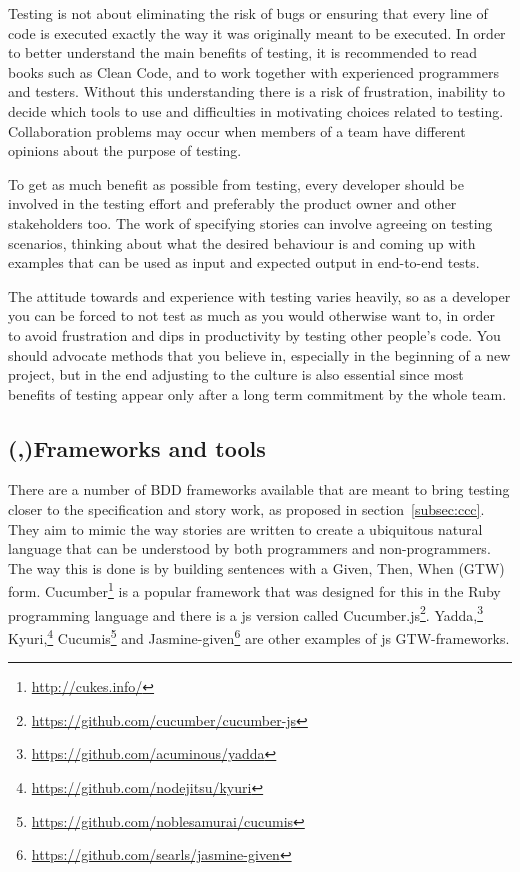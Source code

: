 \documentclass[11pt]{article}
\begin{document}
Testing is not about eliminating the risk of bugs or ensuring that every line of code is executed exactly the way it was originally meant to be executed. In order to better understand the main benefits of testing, it is recommended to read books such as Clean Code, and to work together with experienced programmers and testers. Without this understanding there is a risk of frustration, inability to decide which tools to use and difficulties in motivating choices related to testing. Collaboration problems may occur when members of a team have different opinions about the purpose of testing. \cite[question~38]{Edelstam}

To get as much benefit as possible from testing, every developer should be involved in the testing effort and preferably the product owner and other stakeholders too. The work of specifying stories can involve agreeing on testing scenarios, thinking about what the desired behaviour is and coming up with examples that can be used as input and expected output in end-to-end tests. \cite[questions~39-40]{Edelstam}\cite[question~30]{Stenmark}

The attitude towards and experience with testing varies heavily, so as a developer you can be forced to not test as much as you would otherwise want to, in order to avoid frustration and dips in productivity by testing other people's code. You should advocate methods that you believe in, especially in the beginning of a new project, but in the end adjusting to the culture is also essential since most benefits of testing appear only after a long term commitment by the whole team. \cite[questions~31-32]{Stenmark}

\subsection{(,)Frameworks and tools}
\label{subsec:tools}

There are a number of BDD frameworks available that are meant to bring testing closer to the specification and story work, as proposed in section~\ref{subsec:ccc}. They aim to mimic the way stories are written to create a ubiquitous natural language that can be understood by both programmers and non-programmers. The way this is done is by building sentences with a Given, Then, When (GTW) form. Cucumber\footnote{\url{http://cukes.info/}} is a popular framework that was designed for this in the Ruby programming language and there is a \gls{js} version called Cucumber.js\footnote{\url{https://github.com/cucumber/cucumber-js}}.
Yadda,\footnote{\url{https://github.com/acuminous/yadda}}
Kyuri,\footnote{\url{https://github.com/nodejitsu/kyuri}}
Cucumis\footnote{\url{https://github.com/noblesamurai/cucumis}} and
Jasmine-given\footnote{\url{https://github.com/searls/jasmine-given}}
are other examples of \gls{js} GTW-frameworks. \cite[section 8.4]{BDDJS}
\end{document}
